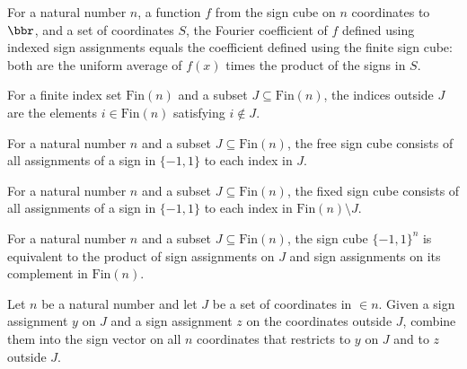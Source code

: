 \begin{theorem}
\label{FABL.indexedFourierCoeff_fin_eq_fourierCoeff}
\leanok
{}
For a natural number $n$, a function $f$ from the sign cube on $n$ coordinates to $\bbr$,
and a set of coordinates $S$, the Fourier coefficient of $f$ defined using indexed sign
assignments equals the coefficient defined using the finite sign cube: both are the
uniform average of $f(x)$ times the product of the signs in $S$.
\end{theorem}

\begin{definition}
\label{FABL.FixedIndex}
\leanok
For a finite index set $\mathrm{Fin}(n)$ and a subset $J\subseteq\mathrm{Fin}(n)$, the
indices outside $J$ are the elements $i\in\mathrm{Fin}(n)$ satisfying $i\notin J$.
\end{definition}

\begin{definition}
\label{FABL.FreeSignCube}
\leanok
{}
For a natural number $n$ and a subset $J\subseteq\mathrm{Fin}(n)$, the free sign cube
consists of all assignments of a sign in $\{−1,1\}$ to each index in $J$.
\end{definition}

\begin{definition}
\label{FABL.FixedSignCube}
\leanok
{}
For a natural number $n$ and a subset $J\subseteq\mathrm{Fin}(n)$, the fixed sign cube
consists of all assignments of a sign in $\{−1,1\}$ to each index in
$\mathrm{Fin}(n)\setminus J$.
\end{definition}

\begin{definition}
\label{FABL.signCubeSplitEquiv}
\leanok
{}
For a natural number $n$ and a subset $J\subseteq\mathrm{Fin}(n)$, the sign cube
$\{−1,1\}^n$ is equivalent to the product of sign assignments on $J$ and sign
assignments on its complement in $\mathrm{Fin}(n)$.
\end{definition}

\begin{definition}
\label{FABL.combineSignCube}
\leanok
{}
Let $n$ be a natural number and let $J$ be a set of coordinates in $\in n$. Given a sign
assignment $y$ on $J$ and a sign assignment $z$ on the coordinates outside $J$, combine
them into the sign vector on all $n$ coordinates that restricts to $y$ on $J$ and to $z$
outside $J$.
\end{definition}


